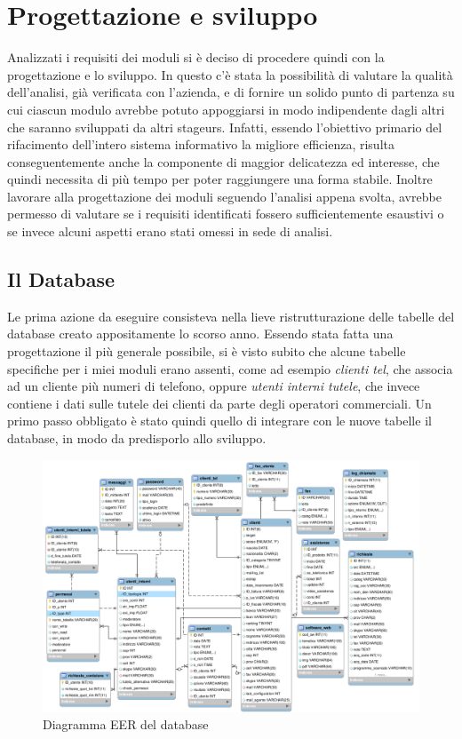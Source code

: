 \section{Progettazione e sviluppo}
Analizzati i requisiti dei moduli si \`e deciso di procedere quindi con la progettazione e lo sviluppo. In questo c'\`e stata la possibilit\`a di valutare la qualit\`a dell'analisi, gi\`a verificata con l'azienda, e di fornire un solido punto di partenza su cui ciascun modulo avrebbe potuto appoggiarsi in modo indipendente dagli altri che saranno sviluppati da altri stageurs. Infatti, essendo l'obiettivo primario del rifacimento dell'intero sistema informativo la migliore efficienza, risulta conseguentemente anche la componente di maggior delicatezza ed interesse, che quindi necessita di pi\`u tempo per poter raggiungere una forma stabile. Inoltre lavorare alla progettazione dei moduli seguendo l'analisi appena svolta, avrebbe permesso di valutare se i requisiti identificati fossero sufficientemente esaustivi o se invece alcuni aspetti erano stati omessi in sede di analisi.

\newpage
\subsection{Il Database}
Le prima azione da eseguire consisteva nella lieve ristrutturazione delle tabelle del database creato appositamente lo scorso anno. Essendo stata fatta una progettazione il pi\`u generale possibile, si \`e visto subito che alcune tabelle specifiche per i miei moduli erano assenti, come ad esempio \textit{clienti tel}, che associa ad un cliente pi\`u numeri di telefono, oppure \textit{utenti interni tutele}, che invece contiene i dati sulle tutele dei clienti da parte degli operatori commerciali. Un primo passo obbligato \`e stato quindi quello di integrare con le nuove tabelle il database, in modo da predisporlo allo sviluppo.

\begin{figure}[!ht]
\centering
  \includegraphics[scale=0.5]{./images/database.png}
\caption{Diagramma EER del database}
\label{EER}
\end{figure}

